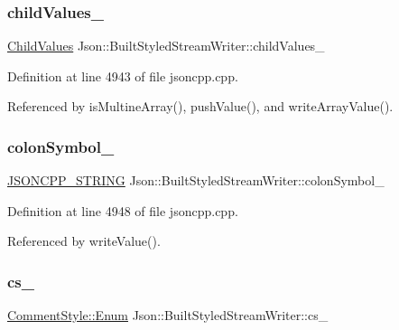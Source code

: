 \subsubsection{\texorpdfstring{child\+Values\+\_\+}{childValues\_}}
{\footnotesize\ttfamily \hyperlink{struct_json_1_1_built_styled_stream_writer_a63196b38400e5ce452f65ce856d47b6f}{Child\+Values} Json\+::\+Built\+Styled\+Stream\+Writer\+::child\+Values\+\_\+\hspace{0.3cm}{\ttfamily [private]}}



Definition at line 4943 of file jsoncpp.\+cpp.



Referenced by is\+Multine\+Array(), push\+Value(), and write\+Array\+Value().

\mbox{\label{struct_json_1_1_built_styled_stream_writer_a9f10991ddef9b77d0b580e24e71483c6}} 
\subsubsection{\texorpdfstring{colon\+Symbol\+\_\+}{colonSymbol\_}}
{\footnotesize\ttfamily \hyperlink{json_8h_a1e723f95759de062585bc4a8fd3fa4be}{J\+S\+O\+N\+C\+P\+P\+\_\+\+S\+T\+R\+I\+NG} Json\+::\+Built\+Styled\+Stream\+Writer\+::colon\+Symbol\+\_\+\hspace{0.3cm}{\ttfamily [private]}}



Definition at line 4948 of file jsoncpp.\+cpp.



Referenced by write\+Value().

\mbox{\label{struct_json_1_1_built_styled_stream_writer_a89a9c76c7531143b52785861ba21c1d4}} 
\subsubsection{\texorpdfstring{cs\+\_\+}{cs\_}}
{\footnotesize\ttfamily \hyperlink{struct_json_1_1_comment_style_a51fc08f3518fd81eba12f340d19a3d0c}{Comment\+Style\+::\+Enum} Json\+::\+Built\+Styled\+Stream\+Writer\+::cs\+\_\+\hspace{0.3cm}{\ttfamily [private]}}



